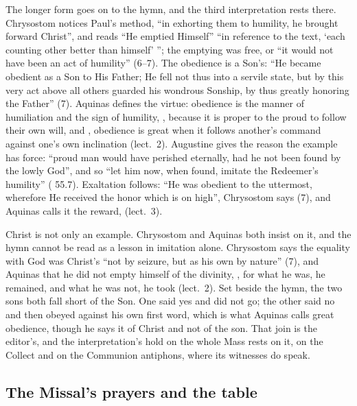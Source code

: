 The longer form goes on to the hymn, and the third interpretation rests there.
Chrysostom notices Paul's method, ``in exhorting them to humility, he brought
forward Christ'', and reads ``He emptied Himself'' ``in reference to the text,
`each counting other better than himself' ''; the emptying was free, or ``it
would not have been an act of humility'' (6--7). The obedience is a Son's: ``He
became obedient as a Son to His Father; He fell not thus into a servile state,
but by this very act above all others guarded his wondrous Sonship, by thus
greatly honoring the Father'' (7). Aquinas defines the virtue: obedience is the
manner of humiliation and the sign of humility, , because it is proper to the proud to follow their
own will, and , obedience is great when it follows another's
command against one's own inclination (lect.~2). Augustine gives the reason the
example has force: ``proud man would have perished eternally, had he not been
found by the lowly God'', and so ``let him now, when found, imitate the
Redeemer's humility'' ( 55.7). Exaltation follows: ``He
was obedient to the uttermost, wherefore He received the honor which is on
high'', Chrysostom says (7), and Aquinas calls it the reward,  (lect.~3).

Christ is not only an example. Chrysostom and Aquinas both insist on it, and
the hymn cannot be read as a lesson in imitation alone. Chrysostom says the equality with God was Christ's ``not by seizure, but as his own by nature''
(7), and Aquinas that he did not empty himself of the divinity, , for what he was, he remained, and
what he was not, he took (lect.~2). Set beside the hymn, the two sons both fall
short of the Son. One said yes and did not go; the other said no and then
obeyed against his own first word, which is what Aquinas calls great obedience,
though he says it of Christ and not of the son. That join is the editor's, and
the interpretation's hold on the whole Mass rests on it, on the Collect and on
the Communion antiphons, where its witnesses do speak.

\subsection{The Missal's prayers and the table}

